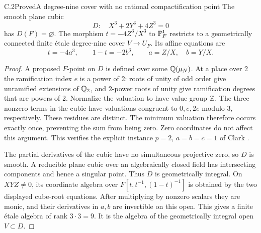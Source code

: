 \begin{statement}{C.2}{Proved}{A degree-nine cover with no rational compactification point}
The smooth plane cubic
\[
 D:\quad X^3+2Y^3+4Z^3=0
\]
has $D(F)=\varnothing$. The morphism $t=-4Z^3/X^3$ to $\mathbb P^1_F$
restricts to a geometrically connected finite \'etale degree-nine
cover $V\to U_F$. Its affine equations are
\[
 t=-4a^3,\qquad 1-t=-2b^3,\qquad a=Z/X,\quad b=Y/X.
\]
\end{statement}
\begin{proof}
A proposed $F$-point on $D$ is defined over some $\mathbb Q(\mu_N)$.
At a place over 2 the ramification index $e$ is a power of 2:
roots of unity of odd order give unramified extensions of $\mathbb Q_2$,
and $2$-power roots of unity give ramification degrees that are
powers of 2. Normalize the valuation to have value group $\mathbb Z$.
The three nonzero terms in the cubic have valuations congruent to
$0,e,2e$ modulo 3, respectively. These residues are distinct.
The minimum valuation therefore occurs exactly once, preventing
the sum from being zero. Zero coordinates do not affect this
argument. This verifies the explicit instance $p=2$, $a=b=c=1$
of Clark \cite[Theorem 1]{Clark2006}.

The partial derivatives of the cubic have no simultaneous projective
zero, so $D$ is smooth. A reducible plane cubic over an algebraically
closed field has intersecting components and hence a singular point.
Thus $D$ is geometrically integral. On $XYZ\ne0$, its coordinate
algebra over $F[t,t^{-1},(1-t)^{-1}]$ is obtained by the two displayed
cube-root equations. After multiplying by nonzero scalars they
are monic, and their derivatives in $a,b$ are invertible on this
open. This gives a finite \'etale algebra of rank $3\cdot3=9$.
It is the algebra of the geometrically integral open $V\subset D$.
\end{proof}

